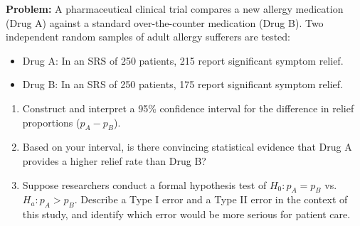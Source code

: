 \begin{frqrubricbox}
\textbf{Problem:} A pharmaceutical clinical trial compares a new allergy medication (Drug A) against a standard over-the-counter medication (Drug B).
Two independent random samples of adult allergy sufferers are tested:
\begin{itemize}
  \item Drug A: In an SRS of 250 patients, 215 report significant symptom relief.
  \item Drug B: In an SRS of 250 patients, 175 report significant symptom relief.
\end{itemize}
\begin{enumerate}[label=(\alph*)]
  \item Construct and interpret a 95\% confidence interval for the difference in relief proportions ($p_A - p_B$).
  \item Based on your interval, is there convincing statistical evidence that Drug A provides a higher relief rate than Drug B?
  \item Suppose researchers conduct a formal hypothesis test of $H_0: p_A = p_B$ vs. $H_a: p_A > p_B$. Describe a Type I error and a Type II error in the context of this study, and identify which error would be more serious for patient care.
\end{enumerate}


\end{frqrubricbox}
